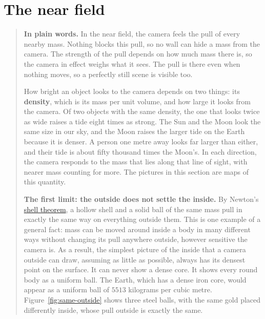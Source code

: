 \section{The near field}\label{sec:near-field}

\begin{quote}
\textbf{In plain words.} In the near field, the camera feels the pull of every
nearby mass. Nothing blocks this pull, so no wall can hide a mass from the
camera. The strength of the pull depends on how much mass there is, so the
camera in effect weighs what it sees. The pull is there even when nothing
moves, so a perfectly still scene is visible too.

How bright an object looks to the camera depends on two things: its
\textbf{density}, which is its mass per unit volume, and how large it looks from
the camera. Of two objects with the same density, the one that looks twice as
wide raises a tide eight times as strong. The Sun and the Moon look the same size in our sky, and the Moon raises
the larger tide on the Earth because it is denser. A person one metre away
looks far larger than either, and their tide is about fifty thousand times the
Moon's. In each direction, the camera responds to the mass that lies along that
line of sight, with nearer mass counting for more. The pictures in this section
are maps of this quantity.

\textbf{The first limit: the outside does not settle the inside.} By Newton's
\href{https://en.wikipedia.org/wiki/Shell_theorem}{shell theorem}, a hollow
shell and a solid ball of the same mass pull in exactly the same way on
everything outside them. This is one example of a general fact: mass can be
moved around inside a body in many different ways without changing its pull
anywhere outside, however sensitive the camera is. As a result, the simplest
picture of the inside that a camera outside can draw, assuming as little as
possible, always has its densest point on the surface. It can never show a
dense core. It shows every round body as a uniform ball. The Earth, which has a
dense iron core, would appear as a uniform ball of $5513$ kilograms per cubic
metre. Figure~\ref{fig:same-outside} shows three steel balls, with the same gold placed differently inside, whose pull outside is exactly the same.


\end{quote}
